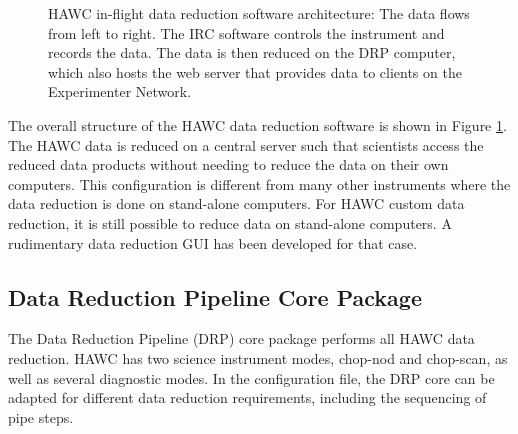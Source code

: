 \begin{figure}

\caption{HAWC in-flight data reduction software architecture: The data flows from left to right. The IRC software controls the instrument and records the data. The data is then reduced on the DRP computer, which also hosts the web server that provides data to clients on the Experimenter Network.}

\label{fig_struct}

\end{figure}

The overall structure of the HAWC data reduction software is shown in Figure \ref{fig_struct}. The HAWC data is reduced on a central server such that scientists access the reduced data products without needing to reduce the data on their own computers. This configuration is different from many other instruments where the data reduction is done on stand-alone computers. For HAWC custom data reduction, it is still possible to reduce data on stand-alone computers. A rudimentary data reduction GUI has been developed for that case.

\subsection{Data Reduction Pipeline Core Package}

The Data Reduction Pipeline (DRP) core package performs all HAWC data reduction. HAWC has two science instrument modes, chop-nod and chop-scan, as well as several diagnostic modes. In the configuration file, the DRP core can be adapted for different data reduction requirements, including the sequencing of pipe steps.

